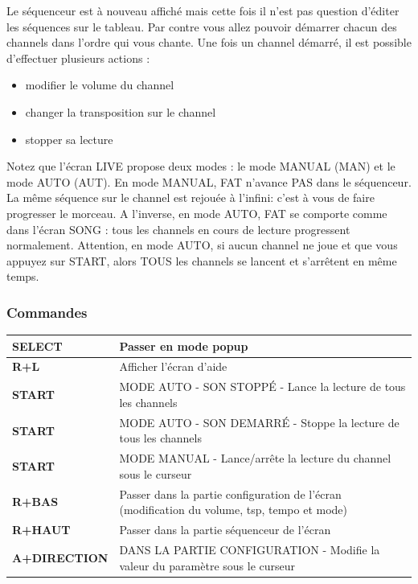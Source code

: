 \documentclass[12pt,a4paper]{article}
\begin{document}
    Le séquenceur est à nouveau affiché mais cette fois il n'est pas question d'éditer les séquences sur le tableau.
    Par contre vous allez pouvoir démarrer chacun des channels dans l'ordre qui vous chante. Une fois un channel démarré, il est possible d'effectuer plusieurs actions :
    \begin{itemize}
        \item{modifier le volume du channel}
        \item{changer la transposition sur le channel}
        \item{stopper sa lecture}
    \end{itemize}
    \medskip
    Notez que l'écran LIVE propose deux modes : le mode MANUAL (MAN) et le mode AUTO (AUT).
    En mode MANUAL, FAT n'avance PAS dans le séquenceur. La même séquence sur le channel est rejouée à l'infini: c'est à vous de faire progresser le morceau.
    A l'inverse, en mode AUTO, FAT se comporte comme dans l'écran SONG : tous les channels en cours de lecture progressent normalement.
    Attention, en mode AUTO, si aucun channel ne joue et que vous appuyez sur START, alors TOUS les channels se lancent et s'arrêtent en même temps.
    \newpage
    \subsubsection{Commandes}
    \begin{supertabular}{|l|p{10cm}|}
        \hline
        {\bf SELECT} & Passer en mode popup \\
        \hline
        {\bf R+L} & Afficher l'écran d'aide \\
        \hline
        {\bf START} & MODE AUTO - SON STOPPÉ - Lance la lecture de tous les channels \\
        \hline
        {\bf START} & MODE AUTO - SON DEMARRÉ - Stoppe la lecture de tous les channels \\
        \hline
        {\bf START} & MODE MANUAL - Lance/arrête la lecture du channel sous le curseur \\
        \hline
        {\bf R+BAS} & Passer dans la partie configuration de l'écran (modification du volume, tsp, tempo et mode) \\
        \hline
        {\bf R+HAUT} & Passer dans la partie séquenceur de l'écran \\
        \hline
        {\bf A+DIRECTION} & DANS LA PARTIE CONFIGURATION - Modifie la valeur du paramètre sous le curseur \\
        \hline
    \end{supertabular}
\end{document}
